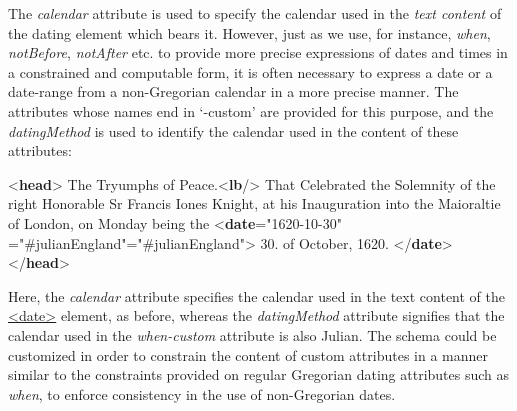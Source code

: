 The {\itshape calendar} attribute is used to specify the calendar used in the \textit{text content} of the dating element which bears it. However, just as we use, for instance, {\itshape when}, {\itshape notBefore}, {\itshape notAfter} etc. to provide more precise expressions of dates and times in a constrained and computable form, it is often necessary to express a date or a date-range from a non-Gregorian calendar in a more precise manner. The attributes whose names end in ‘-custom’ are provided for this purpose, and the {\itshape datingMethod} is used to identify the calendar used in the content of these attributes: \par\bgroup{}\exampleFont \begin{shaded}\noindent\mbox{}{<\textbf{head}>} The Tryumphs of Peace.{<\textbf{lb}/>} That Celebrated the Solemnity of the right Honorable Sr Francis Iones Knight, at\mbox{}\newline 
 his Inauguration into the Maioraltie of London, on Monday being the {<\textbf{date}\hspace*{1em}{when-custom}="{1620-10-30}"\mbox{}\newline 
\hspace*{1em}\hspace*{1em}{datingMethod}="{\#julianEngland}"\hspace*{1em}{calendar}="{\#julianEngland}">} 30. of October, 1620. {</\textbf{date}>}\mbox{}\newline 
{</\textbf{head}>}\end{shaded}\egroup\par \noindent  Here, the {\itshape calendar} attribute specifies the calendar used in the text content of the \hyperref[TEI.date]{<date>} element, as before, whereas the {\itshape datingMethod} attribute signifies that the calendar used in the {\itshape when-custom} attribute is also Julian. The schema could be customized in order to constrain the content of custom attributes in a manner similar to the constraints provided on regular Gregorian dating attributes such as {\itshape when}, to enforce consistency in the use of non-Gregorian dates.\par
